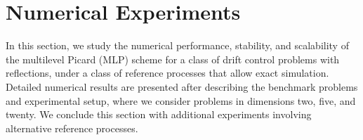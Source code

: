 \documentclass[11pt]{article}
\theoremstyle{definition}
\theoremstyle{plain}
\begin{document}
\section{Numerical Experiments}\label{sec:numerical}

In this section, we study the numerical performance, stability, and scalability of the multilevel Picard (MLP) scheme 
for a class of drift control problems with reflections, 
under a class of reference processes that allow exact simulation. 
Detailed numerical results are presented after describing the benchmark problems and experimental setup, 
where we consider problems in dimensions two, five, and twenty. 
We conclude this section with additional experiments involving alternative reference processes.

\end{document}
